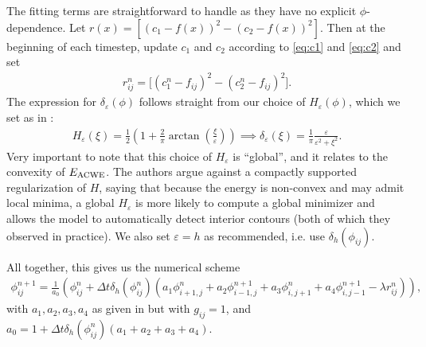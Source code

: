 The fitting terms are straightforward to handle as they have no explicit $\phi$-dependence. Let $r(x) = [(c_1 - f(x))^2 - (c_2 - f(x))^2 ]$. Then at the beginning of each timestep, update $c_1$ and $c_2$ according to \eqref{eq:c1} and \eqref{eq:c2} and set
\begin{align*}
r_{ij}^n = \big[ (c_1^n - f_{ij})^2 - (c_2^n - f_{ij})^2 \big].
\end{align*}
The expression for $\delta_\varepsilon(\phi)$ follows straight from our choice of $H_\varepsilon(\phi)$, which we set as in \cite{chan2001active}:
\begin{align*}
H_\varepsilon(\xi)
 = \frac{1}{2} 
\left(1 + \frac{2}{\pi}\arctan
\left(\frac{\xi}{\varepsilon} 
\right) \right)
\implies 
\delta_\varepsilon(\xi)  
=  \frac{1}{\pi}\frac{\varepsilon}{\varepsilon^2  + \xi^2}.
\end{align*}
Very important to note that this choice of $H_\varepsilon$ is ``global'', and it relates to the convexity of $E_\textrm{ACWE}$. The authors argue against a compactly supported regularization of $H$, saying that because the energy is non-convex and may admit local minima, a global $H_\varepsilon$ is more likely to compute a global minimizer and allows the model to automatically detect interior contours (both of which they observed in practice). We also set $\varepsilon = h$ as recommended, i.e. use $\delta_h(\phi_{ij})$.

All together, this gives us the numerical scheme
\begin{align*}
\phi^{n+1}_{ij} 
= \frac{1}{a_0} 
\left( \phi^n_{ij} + \Delta t \delta_h(\phi_{ij}^n)
\left( a_1 \phi^n_{i+1,j} + a_2 \phi^{n+1}_{i-1,j} + a_3 \phi^{n}_{i,j+1} + a_4 \phi^{n+1}_{i,j-1} 
- \lambda r_{ij}^n
\right)
\right),
\end{align*}
with $a_1, a_2, a_3, a_4$  as given in  but with $g_{ij} = 1$, and $a_0 = 1 + \Delta t \delta_h(\phi_{ij}^n)(a_1 + a_2 + a_3 + a_4)$.


